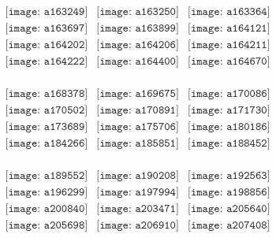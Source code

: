 \documentclass{article}
\begin{document}
\begin{figure}[H]
 \begin{center}$
 \begin{array}{cccc}
\texttt{[image: a163249]}&\texttt{[image: a163250]}&\texttt{[image: a163364]}\\\texttt{[image: a163697]}&\texttt{[image: a163899]}&\texttt{[image: a164121]}\\\texttt{[image: a164202]}&\texttt{[image: a164206]}&\texttt{[image: a164211]}\\\texttt{[image: a164222]}&\texttt{[image: a164400]}&\texttt{[image: a164670]}\\
\end{array}$
\end{center}
\end{figure}

\begin{figure}[H]
 \begin{center}$
 \begin{array}{cccc}
\texttt{[image: a168378]}&\texttt{[image: a169675]}&\texttt{[image: a170086]}\\\texttt{[image: a170502]}&\texttt{[image: a170891]}&\texttt{[image: a171730]}\\\texttt{[image: a173689]}&\texttt{[image: a175706]}&\texttt{[image: a180186]}\\\texttt{[image: a184266]}&\texttt{[image: a185851]}&\texttt{[image: a188452]}\\
\end{array}$
\end{center}
\end{figure}

\begin{figure}[H]
 \begin{center}$
 \begin{array}{cccc}
\texttt{[image: a189552]}&\texttt{[image: a190208]}&\texttt{[image: a192563]}\\\texttt{[image: a196299]}&\texttt{[image: a197994]}&\texttt{[image: a198856]}\\\texttt{[image: a200840]}&\texttt{[image: a203471]}&\texttt{[image: a205640]}\\\texttt{[image: a205698]}&\texttt{[image: a206910]}&\texttt{[image: a207408]}\\
\end{array}$
\end{center}
\end{figure}
\end{document}
